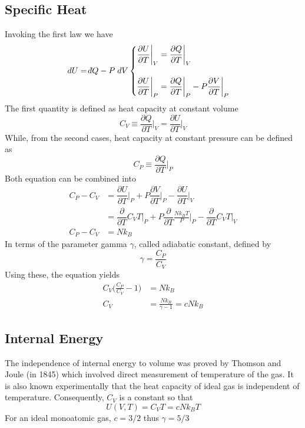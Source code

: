 \documentclass[../../../Main.tex]{subfiles}
\begin{document}
\subsection*{Specific Heat}
Invoking the first law we have
\begin{align*}
    dU=\dbar Q-P\;dV\begin{cases}
        \dfrac{\partial U}{\partial T}\bigg|_V=\dfrac{\partial Q}{\partial T}\bigg|_V\\
        \\
        \dfrac{\partial U}{\partial T}\bigg|_P=\dfrac{\partial Q}{\partial T}\bigg|_P-P\dfrac{\partial V}{\partial T}\bigg|_P
    \end{cases}
\end{align*}
The first quantity is defined as heat capacity at constant volume
\begin{equation*}
    C_V\equiv\frac{\partial Q}{\partial T}\bigg|_V=\frac{\partial U}{\partial T}\bigg|_V
\end{equation*}
While, from the second cases, heat capacity at constant pressure can be defined as 
\begin{equation*}
    C_P\equiv\dfrac{\partial Q}{\partial T}\bigg|_P
\end{equation*}
Both equation can be combined into 
\begin{align*}
    C_P-C_V&=\dfrac{\partial U}{\partial T}\bigg|_P+P\dfrac{\partial V}{\partial T}\bigg|_P-\dfrac{\partial U}{\partial T}\bigg|_V\\
    &=\dfrac{\partial }{\partial T}C_VT\bigg|_P+P\dfrac{\partial }{\partial T}\frac{Nk_BT}{P}\bigg|_P-\dfrac{\partial }{\partial T}C_VT\bigg|_V\\
    C_P-C_V&=Nk_B
\end{align*}
In terms of the parameter gamma $\gamma$, called adiabatic constant, defined by
\begin{equation*}
    \gamma=\frac{C_P}{C_V}
\end{equation*}
Using these, the equation yields 
\begin{align*}
    C_V\biggl(\frac{C_P}{C_V}-1\biggr)&=Nk_B\\
    C_V&=\frac{Nk_B}{\gamma-1}=cNk_B
\end{align*}

\subsection*{Internal Energy}
The independence of internal energy to volume was proved by Thomson and Joule (in 1845) which involved direct measurement of temperature of the gas. It is also known experimentally that the heat capacity of ideal gas is independent of temperature. Consequently, $C_V$ is a constant so that
\begin{equation*}
    U(V,T)=C_VT=cNk_BT
\end{equation*}
For an ideal monoatomic gas, $c=3/2$ thus $\gamma=5/3$
\end{document}
